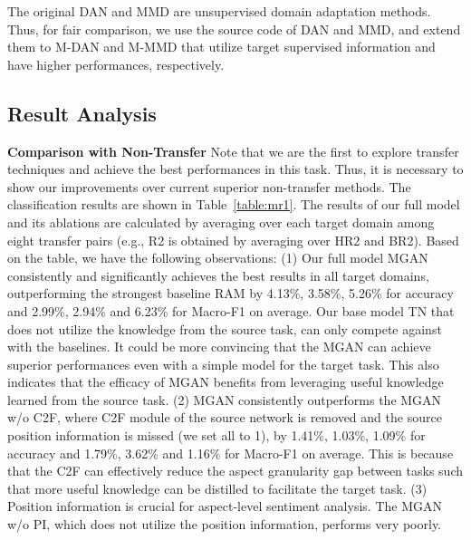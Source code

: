 \documentclass[letterpaper]{article} \usepackage{aaai19}  \usepackage{times}  \usepackage{latexsym}
\begin{document}
The original DAN and MMD are unsupervised domain adaptation methods. Thus, for fair comparison, we use the source code of DAN and MMD, and extend them to M-DAN and M-MMD that utilize target supervised information and have higher performances, respectively.

\subsection{Result Analysis}
\noindent \textbf{Comparison with Non-Transfer}
Note that we are the first to explore transfer techniques and achieve the best performances in this task. Thus, it is necessary to show our improvements over current superior non-transfer methods. The classification results are shown in Table~\ref{table:mr1}. The results of our full model and its ablations are calculated by averaging over each target domain among eight transfer pairs (e.g., R2 is obtained by averaging over HR2 and BR2). Based on the table, we have the following observations: (1) Our full model MGAN consistently and significantly achieves the best results in all target domains, outperforming the strongest baseline RAM by 4.13\%, 3.58\%, 5.26\% for accuracy and 2.99\%, 2.94\% and 6.23\% for Macro-F1 on average. Our base model TN that does not utilize the knowledge from the source task, can only compete against with the baselines. It could be more convincing that the MGAN can achieve superior performances even with a simple model for the target task. This also indicates that the efficacy of MGAN benefits from leveraging useful knowledge learned from the source task. (2) MGAN consistently outperforms the MGAN w/o C2F, where C2F module of the source network is removed and the source position information is missed (we set all  to 1), by 1.41\%, 1.03\%, 1.09\% for accuracy and 1.79\%, 3.62\% and 1.16\% for Macro-F1 on average. This is because that the C2F can effectively reduce the aspect granularity gap between tasks such that more useful knowledge can be distilled to facilitate the target task. (3) Position information is crucial for aspect-level sentiment analysis. The MGAN w/o PI, which does not utilize the position information, performs very poorly.
\end{document}
